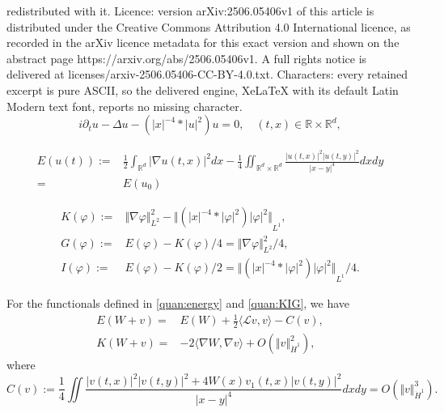 \documentclass[10pt,a4paper]{amsart}
\newcommand{\R}{\mathbb{R}}
\begin{document}
redistributed with it. Licence: version arXiv:2506.05406v1 of this article is distributed under the Creative Commons Attribution 4.0 International licence, as recorded in the arXiv licence metadata for this exact version and shown on the abstract page https://arxiv.org/abs/2506.05406v1. A full rights notice is delivered at licenses/arxiv-2506.05406-CC-BY-4.0.txt. Characters: every retained excerpt is pure ASCII, so the delivered engine, XeLaTeX with its default Latin Modern text font, reports no missing character.
	\begin{equation}\label{equ:Hart}
	i \partial_t u - \Delta u  - \left( |x|^{-4}*|u|^2\right)u =0,\quad
	(t,x)\in \R \times \R^d,
	\end{equation}

	\begin{align}\label{quan:energy}
 E(u(t)):=&\frac12 \int_{\R^d} \big| \nabla u(t,x)\big|^2 dx-\frac{1}{4} \iint_{\R^d\times \R^d} \frac{\big|u(t,x)\big|^2\big|u(t,y)\big|^2}{|x-y|^4} dxdy\\
	=&E(u_0) \nonumber
	\end{align}

		\begin{equation}\label{quan:KIG}
		\begin{aligned}
		K(\varphi):=&\Vert \nabla \varphi \Vert_{L^2}^{2} -{\Vert{\left(|x|^{-4}*|\varphi|^2\right)|\varphi|^2}\Vert}_{L^1},\\
		G(\varphi):=&E(\varphi)-K(\varphi)/4=\Vert \nabla \varphi \Vert_{L^2}^{2} /4,\\
		I(\varphi):=&E(\varphi)-K(\varphi)/2={\Vert{\left(|x|^{-4}*|\varphi|^2\right)|\varphi|^2}\Vert}_{L^1}/4.
		\end{aligned}
		\end{equation}

	\begin{lemma} For the functionals defined in \eqref{quan:energy} and \eqref{quan:KIG}, we have
		\begin{equation}\label{est:EK expa}
		\begin{aligned}
		E(W+v)=&E(W)+\frac{1}{2}\langle \mathcal{L}v,v\rangle-C(v),\\
		K(W+v)=&-2\langle \nabla W,\nabla v\rangle+O(\Vert v\Vert_{\dot H^1}^2),
		\end{aligned}
		\end{equation}
		where 
		\begin{equation*}
		C(v):=\frac{1}{4}\iint \frac{\big|v(t,x)\big|^2\big|v(t,y)\big|^2+4W(x)v_1(t,x)\big|v(t,y)\big|^2}{|x-y|^4} dxdy=O(\Vert v \Vert_{\dot H^1}^3).
		\end{equation*}
	\end{lemma}
\end{document}
